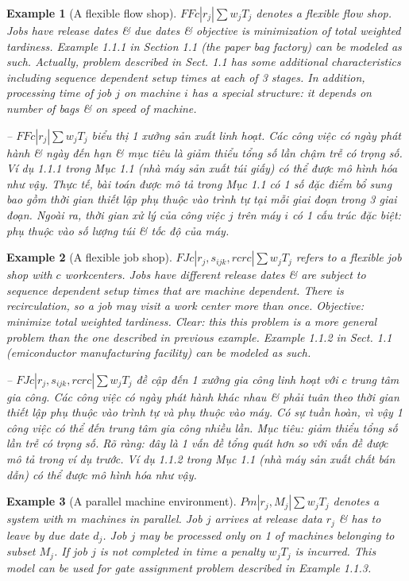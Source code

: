 \documentclass{article}
\newtheorem{example}{Example}
\begin{document}
\begin{itemize}
\begin{itemize}
        \begin{example}[A flexible flow shop]
            $FFc|r_j|\sum w_jT_j$ denotes a flexible flow shop. Jobs have release dates \& due dates \& objective is minimization of total weighted tardiness. Example 1.1.1 in Section 1.1 (the paper bag factory) can be modeled as such. Actually, problem described in Sect. 1.1 has some additional characteristics including sequence dependent setup times at each of 3 stages. In addition, processing time of job $j$ on machine $i$ has a special structure: it depends on number of bags \& on speed of machine.

            -- $FFc|r_j|\sum w_jT_j$ biểu thị 1 xưởng sản xuất linh hoạt. Các công việc có ngày phát hành \& ngày đến hạn \& mục tiêu là giảm thiểu tổng số lần chậm trễ có trọng số. Ví dụ 1.1.1 trong Mục 1.1 (nhà máy sản xuất túi giấy) có thể được mô hình hóa như vậy. Thực tế, bài toán được mô tả trong Mục 1.1 có 1 số đặc điểm bổ sung bao gồm thời gian thiết lập phụ thuộc vào trình tự tại mỗi giai đoạn trong 3 giai đoạn. Ngoài ra, thời gian xử lý của công việc $j$ trên máy $i$ có 1 cấu trúc đặc biệt: phụ thuộc vào số lượng túi \& tốc độ của máy.
        \end{example}

        \begin{example}[A flexible job shop]
            $FJc|r_j,s_{ijk},rcrc|\sum w_jT_j$ refers to a flexible job shop with $c$ workcenters. Jobs have different release dates \& are subject to sequence dependent setup times that are machine dependent. There is recirculation, so a job may visit a work center more than once. Objective: minimize total weighted tardiness. Clear: this this problem is a more general problem than the one described in previous example. Example 1.1.2 in Sect. 1.1 (emiconductor manufacturing facility) can be modeled as such.

            -- $FJc|r_j,s_{ijk},rcrc|\sum w_jT_j$ đề cập đến 1 xưởng gia công linh hoạt với $c$ trung tâm gia công. Các công việc có ngày phát hành khác nhau \& phải tuân theo thời gian thiết lập phụ thuộc vào trình tự và phụ thuộc vào máy. Có sự tuần hoàn, vì vậy 1 công việc có thể đến trung tâm gia công nhiều lần. Mục tiêu: giảm thiểu tổng số lần trễ có trọng số. Rõ ràng: đây là 1 vấn đề tổng quát hơn so với vấn đề được mô tả trong ví dụ trước. Ví dụ 1.1.2 trong Mục 1.1 (nhà máy sản xuất chất bán dẫn) có thể được mô hình hóa như vậy.
        \end{example}

        \begin{example}[A parallel machine environment]
            $Pm|r_j,M_j|\sum w_jT_j$ denotes a system with $m$ machines in parallel. Job $j$ arrives at release data $r_j$ \& has to leave by due date $d_j$. Job $j$ may be processed only on 1 of machines belonging to subset $M_j$. If job $j$ is not completed in time a penalty $w_jT_j$ is incurred. This model can be used for gate assignment problem described in Example 1.1.3.


\end{example}
\end{itemize}
\end{itemize}
\end{document}
